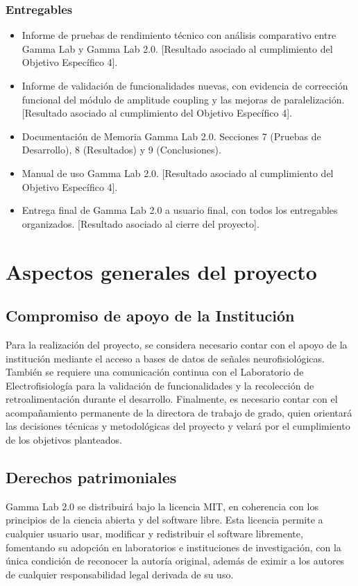 \documentclass[12pt,letterpaper]{article}
\begin{document}
\subsubsection{Entregables}

\begin{itemize}
  \item Informe de pruebas de rendimiento técnico con análisis comparativo entre Gamma Lab y Gamma Lab 2.0. [Resultado asociado al cumplimiento del Objetivo Específico 4].
 \item Informe de validación de funcionalidades nuevas, con evidencia de corrección funcional del módulo de amplitude coupling y las mejoras de paralelización. [Resultado asociado al cumplimiento del Objetivo Específico 4].
  \item Documentación de Memoria Gamma Lab 2.0. Secciones 7 (Pruebas de Desarrollo), 8 (Resultados) y 9 (Conclusiones).
  \item Manual de uso Gamma Lab 2.0. [Resultado asociado al cumplimiento del Objetivo Específico 4].
  \item Entrega final de Gamma Lab 2.0 a usuario final, con todos los entregables organizados. [Resultado asociado al cierre del proyecto].
\end{itemize}

\section{Aspectos generales del proyecto
}

\subsection{Compromiso de apoyo de la Institución}
Para la realización del proyecto, se considera necesario contar con el apoyo de la institución mediante el acceso a bases de datos de señales neurofisiológicas. También se requiere una comunicación continua con el Laboratorio de Electrofisiología para la validación de funcionalidades y la recolección de retroalimentación durante el desarrollo. Finalmente, es necesario contar con el acompañamiento permanente de la directora de trabajo de grado, quien orientará las decisiones técnicas y metodológicas del proyecto y velará por el cumplimiento de los objetivos planteados.
\subsection{Derechos patrimoniales}
Gamma Lab 2.0 se distribuirá bajo la licencia MIT, en coherencia con los principios de la ciencia abierta y del software libre. Esta licencia permite a cualquier usuario usar, modificar y redistribuir el software libremente, fomentando su adopción en laboratorios e instituciones de investigación, con la única condición de reconocer la autoría original, además de eximir a los autores de cualquier responsabilidad legal derivada de su uso.
\end{document}
